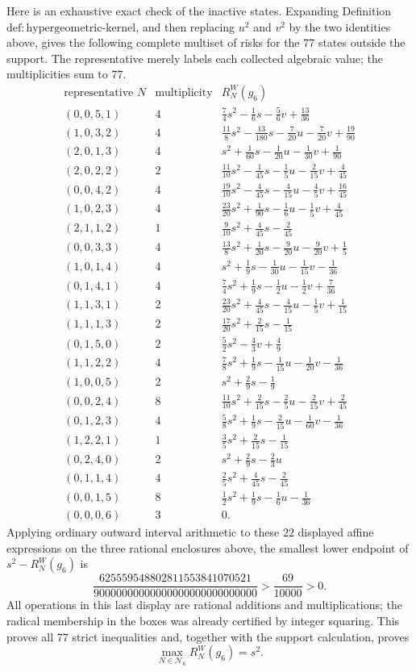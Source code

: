 Here is an exhaustive exact check of the inactive states.  Expanding Definition \(\mathrm{def{:}hypergeometric\mbox{-}kernel}\), and then replacing \(u^2\) and \(v^2\) by the two identities above, gives the following complete multiset of risks for the \(77\) states outside the support.  The representative merely labels each collected algebraic value; the multiplicities sum to \(77\).
\[
\begin{array}{c|r|l}
\text{representative }N&\text{multiplicity}&R_N^W(g_6)\\ \hline
(0,0,5,1)&4&\frac74s^2-\frac16s-\frac56v+\frac{13}{36}\\
(1,0,3,2)&4&\frac{11}{8}s^2-\frac{13}{180}s-\frac7{20}u-\frac7{20}v+\frac{19}{90}\\
(2,0,1,3)&4&s^2+\frac1{60}s-\frac1{20}u-\frac1{30}v+\frac1{90}\\
(2,0,2,2)&2&\frac{11}{10}s^2-\frac1{45}s-\frac15u-\frac2{15}v+\frac4{45}\\
(0,0,4,2)&4&\frac{19}{10}s^2-\frac4{45}s-\frac4{15}u-\frac45v+\frac{16}{45}\\
(1,0,2,3)&4&\frac{23}{20}s^2+\frac1{90}s-\frac16u-\frac15v+\frac4{45}\\
(2,1,1,2)&1&\frac9{10}s^2+\frac4{45}s-\frac2{45}\\
(0,0,3,3)&4&\frac{13}{8}s^2+\frac1{20}s-\frac9{20}u-\frac9{20}v+\frac15\\
(1,0,1,4)&4&s^2+\frac19s-\frac1{30}u-\frac1{15}v-\frac1{36}\\
(0,1,4,1)&4&\frac74s^2+\frac19s-\frac12u-\frac12v+\frac7{36}\\
(1,1,3,1)&2&\frac{23}{20}s^2+\frac4{45}s-\frac4{15}u-\frac15v+\frac1{15}\\
(1,1,1,3)&2&\frac{17}{20}s^2+\frac2{15}s-\frac1{15}\\
(0,1,5,0)&2&\frac52s^2-\frac43v+\frac49\\
(1,1,2,2)&4&\frac78s^2+\frac19s-\frac1{15}u-\frac1{20}v-\frac1{36}\\
(1,0,0,5)&2&s^2+\frac29s-\frac19\\
(0,0,2,4)&8&\frac{11}{10}s^2+\frac2{15}s-\frac25u-\frac2{15}v+\frac2{45}\\
(0,1,2,3)&4&\frac58s^2+\frac19s-\frac2{15}u-\frac1{60}v-\frac1{36}\\
(1,2,2,1)&1&\frac35s^2+\frac2{15}s-\frac1{15}\\
(0,2,4,0)&2&s^2+\frac29s-\frac23u\\
(0,1,1,4)&4&\frac25s^2+\frac4{45}s-\frac2{45}\\
(0,0,1,5)&8&\frac12s^2+\frac19s-\frac16u-\frac1{36}\\
(0,0,0,6)&3&0.
\end{array}
\]
Applying ordinary outward interval arithmetic to these \(22\) displayed affine expressions on the three rational enclosures above, the smallest lower endpoint of \(s^2-R_N^W(g_6)\) is
\[
 \frac{625559548802811553841070521}
 {90000000000000000000000000000}>\frac{69}{10000}>0.
\]
All operations in this last display are rational additions and multiplications; the radical membership in the boxes was already certified by integer squaring.  This proves all \(77\) strict inequalities and, together with the support calculation, proves
\[
 \max_{N\in\mathcal N_6}R_N^W(g_6)=s^2.
\]

